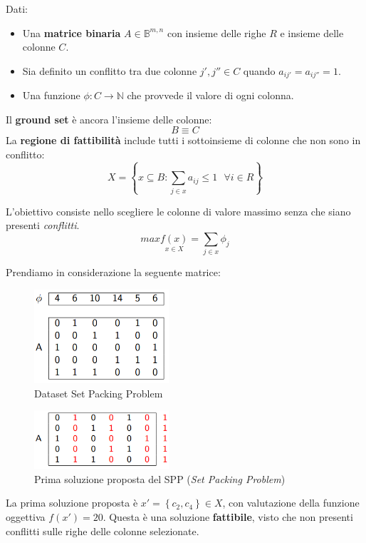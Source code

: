 \documentclass{article}
\begin{document}
Dati:
\begin{itemize}
    \item Una \textbf{matrice binaria} $A\in \mathbb{B}^{m,n}$ con insieme delle righe $R$ e insieme delle colonne $C$.
    \item Sia definito un conflitto tra due colonne $j',j'' \in C$ quando $a_{ij'}=a_{ij''}=1$.
    \item Una funzione $\phi:C\rightarrow \mathbb{N}$ che provvede il valore di ogni colonna.
\end{itemize}
Il \textbf{ground set} è ancora l'insieme delle colonne:
$$B\equiv C$$
La \textbf{regione di fattibilità} include tutti i sottoinsieme di colonne che non sono in conflitto:
$$X=\left\{x\subseteq B:\sum_{j\in x}a_{ij}\leq 1 \text{ } \forall i \in R\right\}$$

L'obiettivo consiste nello scegliere le colonne di valore massimo senza che siano presenti \textit{conflitti}.
$$max\underset{x\in X}{f(x)}=\sum_{j \in x}\phi_j$$

Prendiamo in considerazione la seguente matrice:

\begin{figure}[H]
    \centering
    \includegraphics[width=5cm]{images/SPP_dataset.png}
    \caption{Dataset Set Packing Problem}
    \label{fig:datasets_SPP}
\end{figure}

\begin{figure}[H]
    \centering
    \includegraphics[width=5cm]{images/SPP_first_sol.png}
    \caption{Prima soluzione proposta del SPP (\textit{Set Packing Problem})}
    \label{fig:fst_sol_SPP}
\end{figure}


La prima soluzione proposta è $x'=\left\{c_2,c_4\right\}\in X$, con valutazione della funzione oggettiva
$f(x')=20$. Questa è una soluzione \textbf{fattibile}, visto che non presenti conflitti sulle righe delle colonne
selezionate.
\end{document}
